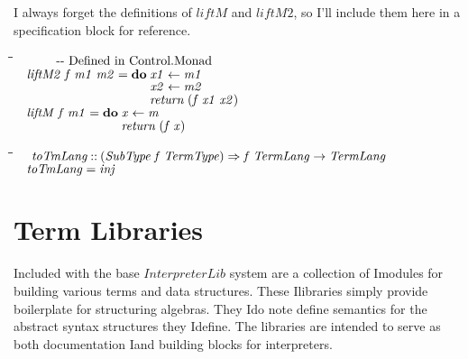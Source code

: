 \documentclass[10pt]{article}
\newlength{\lwidth}\setlength{\lwidth}{4.5cm}
\newlength{\cwidth}\setlength{\cwidth}{8mm} %
\newcommand{\Conid}[1]{\mathit{#1}}
\newcommand{\Varid}[1]{\mathit{#1}}
\begin{document}
I always forget the definitions of \ensuremath{\Varid{liftM}} and \ensuremath{\Varid{liftM2}}, so I'll
include them here in a specification block for reference.

\begin{tabbing}
\qquad\=\hspace{\lwidth}\=\hspace{\cwidth}\=\+\kill
${\hskip1.00em\relax\mbox{\qquad-{}-  Defined in Control.Monad}}$\\
${\hskip1.00em\relax\Varid{liftM2}\;\Varid{f}\;\Varid{m1}\;\Varid{m2}\mathrel{=}\mathbf{do}\;\Varid{x1}\leftarrow \Varid{m1}}$\\
${\hskip1.00em\relax\phantom{\Varid{liftM2}\;\Varid{f}\;\Varid{m1}\;\Varid{m2}\mathrel{=}\mathbf{do}\;\mbox{}}\Varid{x2}\leftarrow \Varid{m2}}$\\
${\hskip1.00em\relax\phantom{\Varid{liftM2}\;\Varid{f}\;\Varid{m1}\;\Varid{m2}\mathrel{=}\mathbf{do}\;\mbox{}}\Varid{return}\;(\Varid{f}\;\Varid{x1}\;\Varid{x2})}$\\
${}$\\
${\hskip1.00em\relax\Varid{liftM}\;\Varid{f}\;\Varid{m1}\mathrel{=}\mathbf{do}\;\Varid{x}\leftarrow \Varid{m}}$\\
${\hskip1.00em\relax\phantom{\Varid{liftM}\;\Varid{f}\;\Varid{m1}\mathrel{=}\mathbf{do}\;\mbox{}}\Varid{return}\;(\Varid{f}\;\Varid{x})}$
\end{tabbing}
\begin{tabbing}
\qquad\=\hspace{\lwidth}\=\hspace{\cwidth}\=\+\kill
${\hskip1.00em\relax\Varid{toTmLang}\mathbin{::}(\Conid{SubType}\;\Varid{f}\;\Conid{TermType})\Rightarrow \Varid{f}\;\Conid{TermLang}\to \Conid{TermLang}}$\\
${\hskip1.00em\relax\Varid{toTmLang}\mathrel{=}\Varid{inj}}$
\end{tabbing}
\section{Term Libraries}

Included with the base \ensuremath{\Conid{InterpreterLib}} system are a collection of
Imodules for building various terms and data structures.  These
Ilibraries simply provide boilerplate for structuring algebras.  They
Ido note define semantics for the abstract syntax structures they
Idefine.  The libraries are intended to serve as both documentation
Iand building blocks for interpreters.
\end{document}
